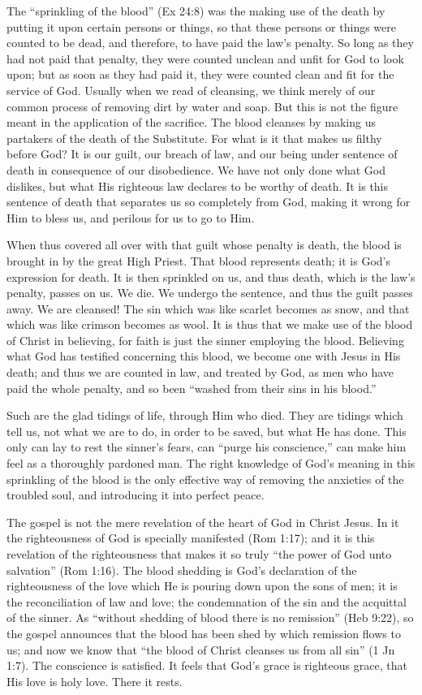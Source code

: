 \documentclass[
]{book}
\begin{document}
The ``sprinkling of the blood'' (Ex 24:8) was the making use of the death by putting it upon certain persons or things, so that these persons or things were counted to be dead, and therefore, to have paid the law's penalty. So long as they had not paid that penalty, they were counted unclean and unfit for God to look upon; but as soon as they had paid it, they were counted clean and fit for the service of God. Usually when we read of cleansing, we think merely of our common process of removing dirt by water and soap. But this is not the figure meant in the application of the sacrifice. The blood cleanses by making us partakers of the death of the Substitute. For what is it that makes us filthy before God? It is our guilt, our breach of law, and our being under sentence of death in consequence of our disobedience. We have not only done what God dislikes, but what His righteous law declares to be worthy of death. It is this sentence of death that separates us so completely from God, making it wrong for Him to bless us, and perilous for us to go to Him.

When thus covered all over with that guilt whose penalty is death, the blood is brought in by the great High Priest. That blood represents death; it is God's expression for death. It is then sprinkled on us, and thus death, which is the law's penalty, passes on us. We die. We undergo the sentence, and thus the guilt passes away. We are cleansed! The sin which was like scarlet becomes as snow, and that which was like crimson becomes as wool. It is thus that we make use of the blood of Christ in believing, for faith is just the sinner employing the blood. Believing what God has testified concerning this blood, we become one with Jesus in His death; and thus we are counted in law, and treated by God, as men who have paid the whole penalty, and so been ``washed from their sins in his blood.''

Such are the glad tidings of life, through Him who died. They are tidings which tell us, not what we are to do, in order to be saved, but what He has done. This only can lay to rest the sinner's fears, can ``purge his conscience,'' can make him feel as a thoroughly pardoned man. The right knowledge of God's meaning in this sprinkling of the blood is the only effective way of removing the anxieties of the troubled soul, and introducing it into perfect peace.

The gospel is not the mere revelation of the heart of God in Christ Jesus. In it the righteousness of God is specially manifested (Rom 1:17); and it is this revelation of the righteousness that makes it so truly ``the power of God unto salvation'' (Rom 1:16). The blood shedding is God's declaration of the righteousness of the love which He is pouring down upon the sons of men; it is the reconciliation of law and love; the condemnation of the sin and the acquittal of the sinner. As ``without shedding of blood there is no remission'' (Heb 9:22), so the gospel announces that the blood has been shed by which remission flows to us; and now we know that ``the blood of Christ cleanses us from all sin'' (1 Jn 1:7). The conscience is satisfied. It feels that God's grace is righteous grace, that His love is holy love. There it rests.
\end{document}
